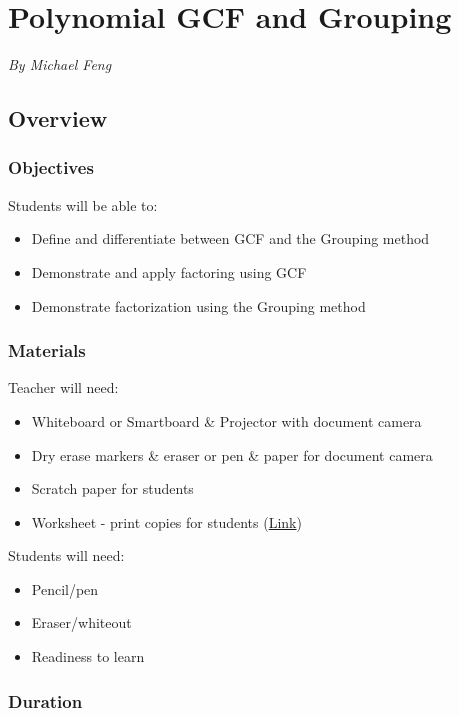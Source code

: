 \chapter{Polynomial GCF and Grouping}

\emph{By Michael Feng}

\section{Overview}

\subsection{Objectives}

Students will be able to:
\begin{itemize}
    \item Define and differentiate between GCF and the Grouping method
    \item Demonstrate and apply factoring using GCF
    \item Demonstrate factorization using the Grouping method
\end{itemize}

\subsection{Materials}

Teacher will need:
\begin{itemize}
    \item Whiteboard or Smartboard \& Projector with document camera
    \item Dry erase markers \& eraser or pen \& paper for document camera
    \item Scratch paper for students
    \item Worksheet - print copies for students (\href{https://www.celinaschools.org/Downloads/Factoring%20By%20Grouping%20Review.pdf}{Link})
\end{itemize}

Students will need:
\begin{itemize}
    \item Pencil/pen
    \item Eraser/whiteout
    \item Readiness to learn
\end{itemize}

\subsection{Duration}

